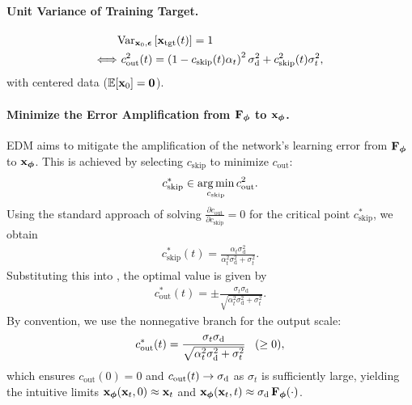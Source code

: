 \paragraph{Unit Variance of Training Target.}
\begin{align}\label{eq:c-out}
    &\text{Var}_{{\mathbf{x}}_0,\bm{\epsilon}}\left[ {\mathbf{x}}_{\mathrm{tgt}}(t) \right] = 1 \nonumber
    \\ \Longleftrightarrow &~c_{\mathrm{out}}^2(t)  = \left(1-c_{\mathrm{skip}}(t)\alpha_t\right)^2 \sigma_{\mathrm{d}}^2 + c_{\mathrm{skip}}^2(t)\sigma_t^2, 
\end{align}
with centered data ($\mathbb{E}[{\mathbf{x}}_0]=\bm{0}$).
\paragraph{Minimize the Error Amplification from ${\mathbf{F}}_{\bm{\phi}}$ to ${\mathbf{x}}_{\bm{\phi}}$.} EDM aims to mitigate the amplification of the network's learning error from ${\mathbf{F}}_{\bm{\phi}}$ to ${\mathbf{x}}_{\bm{\phi}}$. This is achieved by selecting $c_{\mathrm{skip}}$ to minimize $c_{\mathrm{out}}$:
\[
c_{\mathrm{skip}}^* \in \operatorname*{arg\,min}_{c_{\mathrm{skip}}}  c_{\mathrm{out}}^2.
\]
Using the standard approach of solving $\frac{\partial c_{\mathrm{out}}}{\partial c_{\mathrm{skip}}} = 0$ for the critical point $c_{\mathrm{skip}}^*$, we obtain
\begin{align*}
    c_{\mathrm{skip}}^*(t) = \frac{\alpha_t \sigma_{\mathrm{d}}^2 }{\alpha_t^2 \sigma_{\mathrm{d}}^2  + \sigma_t^2}. 
\end{align*}
Substituting this into , the optimal value is given by
\begin{align*}
    c_{\mathrm{out}}^*(t) = \pm \frac{\sigma_t \sigma_{\mathrm{d}} }{\sqrt{\alpha_t^2 \sigma_{\mathrm{d}}^2  + \sigma_t^2}}. 
\end{align*}
By convention, we use the nonnegative branch for the output scale:
\[
c_{\mathrm{out}}^*(t) = \frac{\sigma_t \sigma_{\text d}}
{\sqrt{\alpha_t^2 \sigma_{\text d}^2 + \sigma_t^2}}
\;\;\;(\ge 0),
\]
which ensures $c_{\mathrm{out}}(0)=0$ and $c_{\mathrm{out}}(t)\to\sigma_{\text d}$ as $\sigma_t$ is sufficiently large,
yielding the intuitive limits ${\mathbf{x}}_{\bm{\phi}}({\mathbf{x}}_t,0)\approx {\mathbf{x}}_t$ and
${\mathbf{x}}_{\bm{\phi}}({\mathbf{x}}_t,t)\approx \sigma_{\text d}\,{\mathbf{F}}_{\bm{\phi}}(\cdot)$.




